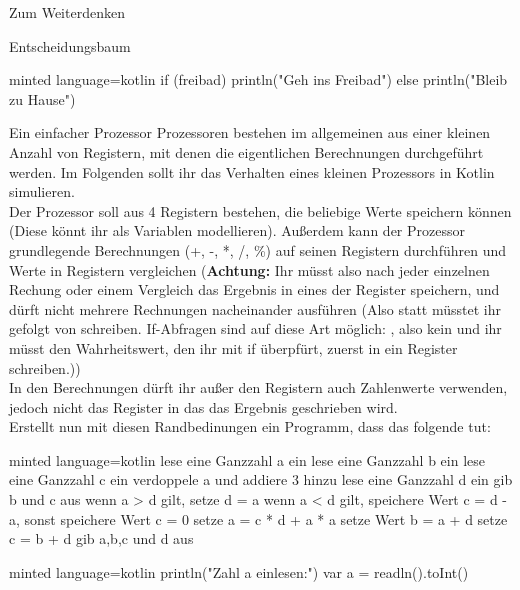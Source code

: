 \begin{task}[points=auto]{Zum Weiterdenken }
\begin{subtask*}[points=0]{Entscheidungsbaum}
\begin{solution}
\begin{codeBlock}[]{minted language=kotlin}
                if (freibad) {
                    println("Geh ins Freibad")
                } else {
                    println("Bleib zu Hause")
                }
            \end{codeBlock}
        \end{solution}
    \end{subtask*}
    \begin{subtask*}[points=0]{Ein einfacher Prozessor}
        Prozessoren bestehen im allgemeinen aus einer kleinen Anzahl von Registern, mit denen die eigentlichen Berechnungen durchgeführt werden. Im Folgenden sollt ihr das Verhalten eines kleinen Prozessors in Kotlin simulieren. \\
        Der Prozessor soll aus 4 Registern bestehen, die beliebige Werte speichern können (Diese könnt ihr als Variablen modellieren). Außerdem kann der Prozessor grundlegende Berechnungen ({\ttfamily +, -, *, /, \%}) auf seinen Registern durchführen und Werte in Registern vergleichen (\textbf{Achtung:} Ihr müsst also nach jeder einzelnen Rechung oder einem Vergleich das Ergebnis in eines der Register speichern, und dürft nicht mehrere Rechnungen nacheinander ausführen (Also statt  müsstet ihr  gefolgt von  schreiben. If-Abfragen sind auf diese Art möglich: , also kein  und ihr müsst den Wahrheitswert, den ihr mit if überpfürt, zuerst in ein Register schreiben.)) \\
        In den Berechnungen dürft ihr außer den Registern auch Zahlenwerte verwenden, jedoch nicht das Register in das das Ergebnis geschrieben wird.\\
        Erstellt nun mit diesen Randbedinungen ein Programm, dass das folgende tut: \\
        \begin{codeBlock}[]{minted language=kotlin}
            lese eine Ganzzahl a ein
            lese eine Ganzzahl b ein
            lese eine Ganzzahl c ein
            verdoppele a und addiere 3 hinzu
            lese eine Ganzzahl d ein
            gib b und c aus
            wenn a > d gilt, setze d = a
            wenn a < d gilt, speichere Wert c = d - a, sonst speichere Wert c = 0
            setze a = c * d + a * a
            setze Wert b = a + d
            setze c = b + d
            gib a,b,c und d aus
        \end{codeBlock}

        \begin{solution}
            \begin{codeBlock}[]{minted language=kotlin}
                println("Zahl a einlesen:")
                var a = readln().toInt()


\end{codeBlock}
\end{solution}
\end{subtask*}
\end{task}

